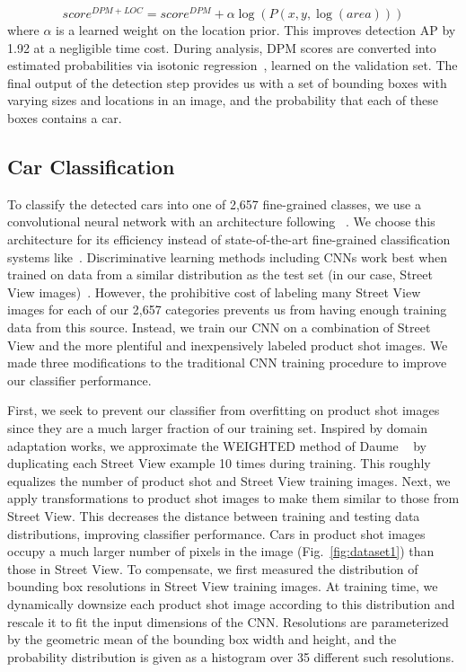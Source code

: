 \documentclass[letterpaper]{article}
\begin{document}
\begin{equation}
score^{DPM+LOC} = score^{DPM} + \alpha \log{(P(x,y,\log{(area)}))}
\end{equation}
where $\alpha$ is a learned weight on the location prior. This improves detection AP by 1.92 at a negligible time cost. During analysis, DPM scores are converted into estimated probabilities via isotonic regression~\cite{isotonic}, learned on the validation set.
The final output of the detection step provides us with a set of bounding boxes with varying sizes and locations in an image, and the probability that each of these boxes contains a car.

\subsection{Car Classification}
To classify the detected cars into one of 2,657 fine-grained classes, we use a convolutional neural network with an architecture following ~\cite{alexnet}. We choose this architecture for its efficiency instead of state-of-the-art fine-grained classification systems like~\cite{jon1,jon2}. Discriminative learning methods including CNNs work best when trained on data from a similar distribution as the test set (in our case, Street View images)~\cite{domain}. However, the prohibitive cost of labeling many Street View images for each of our 2,657 categories prevents us from having enough training data from this source. Instead, we train our CNN on a combination of Street View and the more plentiful and inexpensively labeled product shot images. We made three modifications to the traditional CNN training procedure to improve our classifier performance.

First, we seek to prevent our classifier from overfitting on product shot images since they are a much larger fraction of our training set. Inspired by domain adaptation works, we approximate the WEIGHTED method of Daume  ~\cite{frustrating} by duplicating each Street View example 10 times during training. This roughly equalizes the number of product shot and Street View training images. Next, we apply transformations to product shot images to make them similar to those from Street View. This decreases the distance between training and testing data distributions, improving classifier performance. Cars in product shot images occupy a much larger number of pixels in the image (Fig.~\ref{fig:dataset1}) than those in Street View. To compensate, we first measured the distribution of bounding box resolutions in Street View training images. At training time, we dynamically downsize each product shot image according to this distribution and  rescale it to fit the input dimensions of the CNN. Resolutions are parameterized by the geometric mean of the bounding box width and height, and the probability distribution is given as a histogram over 35 different such resolutions.
\end{document}
